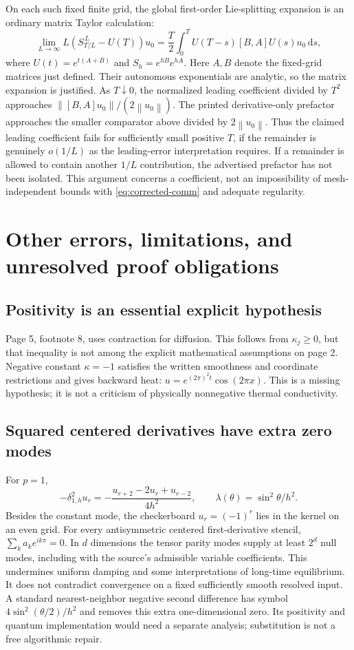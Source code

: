 \documentclass[11pt]{article}
\newcommand{\norm}[1]{\left\lVert #1\right\rVert}
\newcommand{\dd}{\mathrm d}
\begin{document}
On each such fixed finite grid, the global first-order Lie-splitting expansion
is an ordinary matrix Taylor calculation:
\[
 \lim_{L\to\infty}L(S_{T/L}^{\,L}-U(T))u_0
 =\frac T2\int_0^T U(T-s)[B,A]U(s)u_0\,\dd s ,
 \label{eq:global-asymp}
\]
where $U(t)=e^{t(A+B)}$ and $S_h=e^{hB}e^{hA}$.
Here $A,B$ denote the fixed-grid matrices just defined. Their autonomous
exponentials are analytic, so the matrix expansion is justified.
As $T\downarrow0$, the normalized leading coefficient divided by $T^2$
approaches $\norm{[B,A]u_0}/(2\norm{u_0})$.
The printed derivative-only prefactor approaches the smaller comparator
above divided by $2\norm{u_0}$.
Thus the claimed leading coefficient fails for sufficiently small
positive $T$, if the remainder is genuinely $o(1/L)$ as the leading-error
interpretation requires. If a remainder is allowed to contain another
$1/L$ contribution, the advertised prefactor has not been isolated.
This argument concerns a coefficient, not an impossibility of
mesh-independent bounds with \eqref{eq:corrected-comm} and adequate regularity.

\section{Other errors, limitations, and unresolved proof obligations}
\subsection{Positivity is an essential explicit hypothesis}
Page 5, footnote 8, uses contraction for diffusion. This follows from
$\kappa_j\geq0$, but that inequality is not among the explicit mathematical
assumptions on page 2. Negative constant $\kappa=-1$ satisfies the written
smoothness and coordinate restrictions and gives backward heat:
$u=e^{(2\pi)^2t}\cos(2\pi x)$.
This is a missing hypothesis; it is not a criticism of physically
nonnegative thermal conductivity.

\subsection{Squared centered derivatives have extra zero modes}
For $p=1$,
\[
 -\delta_{1,h}^2u_r
 =-\frac{u_{r+2}-2u_r+u_{r-2}}{4h^2},
 \qquad \lambda(\theta)=\sin^2\theta/h^2 .
\]
Besides the constant mode, the checkerboard $u_r=(-1)^r$ lies in the
kernel on an even grid. For every antisymmetric centered first-derivative
stencil, $\sum_k a_k e^{ik\pi}=0$.
In $d$ dimensions the tensor parity modes supply at least $2^d$ null
modes, including with the source's admissible variable coefficients.
This undermines uniform damping and some interpretations of long-time
equilibrium. It does not contradict convergence on a fixed sufficiently
smooth resolved input. A standard nearest-neighbor negative second
difference has symbol $4\sin^2(\theta/2)/h^2$ and removes this extra
one-dimensional zero. Its positivity and quantum implementation would
need a separate analysis; substitution is not a free algorithmic repair.
\end{document}
